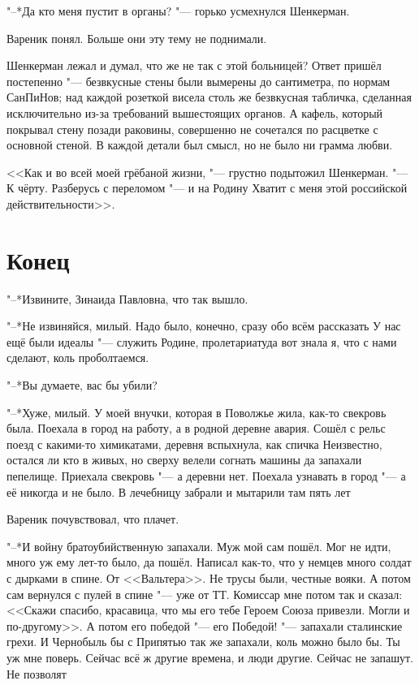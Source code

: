 "--*Да кто меня пустит в органы? "--- горько усмехнулся Шенкерман.

Вареник понял.
Больше они эту тему не поднимали.

Шенкерман лежал и думал, что же не так с этой больницей?
Ответ пришёл постепенно "--- безвкусные стены были вымерены до сантиметра, по нормам СанПиНов;
над каждой розеткой висела столь же безвкусная табличка, сделанная исключительно из-за требований вышестоящих органов.
А кафель, который покрывал стену позади раковины, совершенно не сочетался по расцветке с основной стеной.
В каждой детали был смысл, но не было ни грамма любви.

<<Как и во всей моей грёбаной жизни, "--- грустно подытожил Шенкерман.
"--- К чёрту.
Разберусь с переломом "--- и на Родину\ldotst
Хватит с меня этой российской действительности>>.

\section{Конец}

"--*Извините, Зинаида Павловна, что так вышло.

"--*Не извиняйся, милый.
Надо было, конечно, сразу обо всём рассказать\ldotst
У нас ещё были идеалы "--- служить Родине, пролетариату\ldotst да вот знала я, что с нами сделают, коль проболтаемся.

"--*Вы думаете, вас бы убили?

"--*Хуже, милый.
У моей внучки, которая в Поволжье жила, как-то свекровь была.
Поехала в город на работу, а в родной деревне авария.
Сошёл с рельс поезд с какими-то химикатами, деревня вспыхнула, как спичка\ldotst
Неизвестно, остался ли кто в живых, но сверху велели согнать машины да запахали пепелище.
Приехала свекровь "--- а деревни нет.
Поехала узнавать в город "--- а её никогда и не было.
В лечебницу забрали и мытарили там пять лет\ldotst

Вареник почувствовал, что плачет.

"--*И войну братоубийственную запахали.
Муж мой сам пошёл.
Мог не идти, много уж ему лет-то было, да пошёл.
Написал как-то, что у немцев много солдат с дырками в спине.
От <<Вальтера>>.
Не трусы были, честные вояки.
А потом сам вернулся с пулей в спине "--- уже от ТТ.
Комиссар мне потом так и сказал: <<Скажи спасибо, красавица, что мы его тебе Героем Союза привезли.
Могли и по-другому>>.
А потом его победой "--- его Победой! "--- запахали сталинские грехи.
И Чернобыль бы с Припятью так же запахали, коль можно было бы.
Ты уж мне поверь.
Сейчас всё ж другие времена, и люди другие.
Сейчас не запашут.
Не позволят\ldotst

